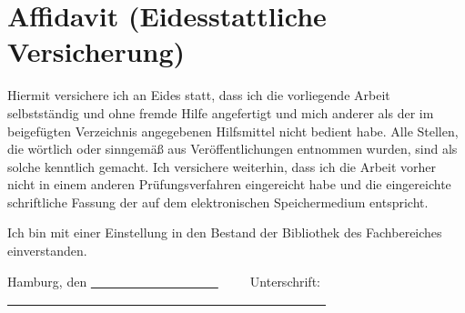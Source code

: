 \chapter*{Affidavit (Eidesstattliche Versicherung)}
\thispagestyle{empty}

Hiermit versichere ich an Eides statt, dass ich die vorliegende Arbeit selbstständig und ohne fremde Hilfe angefertigt und mich anderer als der im beigefügten Verzeichnis angegebenen Hilfsmittel nicht bedient habe.
Alle Stellen, die wörtlich oder sinngemäß aus Veröffentlichungen entnommen wurden, sind als solche kenntlich gemacht.
Ich versichere weiterhin, dass ich die Arbeit vorher nicht in einem anderen Prüfungsverfahren eingereicht habe und die eingereichte schriftliche Fassung der auf dem elektronischen Speichermedium entspricht.

\noindent Ich bin mit einer Einstellung in den Bestand der Bibliothek des Fachbereiches einverstanden.

\vspace{2cm}

\noindent Hamburg, den \uline{~~~~~~~~~~~~~~~~~~~~}~~~~~Unterschrift: \uline{~~~~~~~~~~~~~~~~~~~~~~~~~~~~~~~~~~~~~~~~~~~~~~~~~~}
